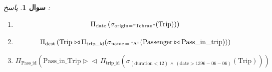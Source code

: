 \documentclass[12pt]{article}
\newtheorem{question}{سوال}
\newcommand{\prd}{\triangleright\!\!\triangleleft\,}
\begin{document}
\begin{question}
	پاسخ :
\begin{latin}
\begin{enumerate}[label=\alph*)]
\item

	$$
	\Pi_{\mathrm{date}}\left(\sigma_{\text{origin}=\mathrm{"Tehran"}}(\mathrm{Trip}))\right)
	$$
	
	
\item 
	\[
	\Pi_{\mathrm{dest}} \left(
	\mathrm{Trip} \prd \Pi_\mathrm{trip\_id}(\sigma_\mathrm{name\,=\,"A"}
	(
	\mathrm{Passenger}\prd \mathrm{Pass\_in\_trip}
	))
	\right)
	\]
	
	
\item 
	\[
	\Pi_{\mathrm{Pass\_id}} \left(
	\mathrm{Pass\_in\_Trip} \prd \Pi_\mathrm{trip\_id}(\sigma_\mathrm{(duration < 12)\,\wedge\,(date > 1396-06-06)}
	(
	\mathrm{Trip}
	))
	\right)
	\]
	

\end{enumerate}
\end{latin}
\end{question}
\end{document}
